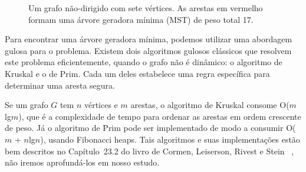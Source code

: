 \begin{figure}
    \centering
    \caption{Um grafo não-dirigido com sete vértices. As arestas em vermelho formam uma árvore geradora mínima (MST) de peso total 17.}
    \label{fig:mst_example}
\end{figure}

Para encontrar uma árvore geradora mínima, podemos utilizar uma abordagem gulosa para o problema. Existem dois algoritmos gulosos clássicos que resolvem este problema eficientemente, quando o grafo não é dinâmico: o algoritmo de Kruskal e o de Prim. Cada um deles estabelece uma regra específica para determinar uma aresta segura.

Se um grafo $G$ tem $n$ vértices e $m$ arestas, o algoritmo de Kruskal consome O($m$lg$m$), que é a complexidade de tempo para ordenar as arestas em ordem crescente de peso. Já o algoritmo de Prim pode ser implementado de modo a consumir O($m$ + $n$lg$n$), usando Fibonacci heaps. Tais algoritmos e suas implementações estão bem descritos no Capítulo~23.2 do livro de Cormen, Leiserson, Rivest e Stein ~\cite{clrs}, não iremos aprofundá-los em nosso estudo. 

